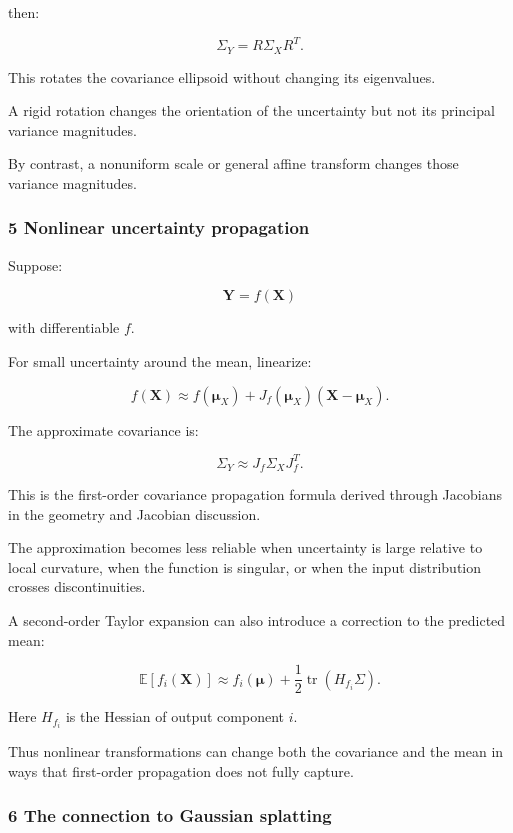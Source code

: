 then:

\[
 \boxed{ \Sigma_Y=R\Sigma_XR^T }.
\]

This rotates the covariance ellipsoid without changing its eigenvalues.

A rigid rotation changes the orientation of the uncertainty but not its principal variance magnitudes.

By contrast, a nonuniform scale or general affine transform changes those variance magnitudes.

\subsubsection{5 Nonlinear uncertainty propagation}\label{02-foundations-ii-ch024-nonlinear-uncertainty-propagation}

\hypertarget{02-foundations-ii-ch024-nonlinear-uncertainty-propagation}{}

Suppose:

\[
 \mathbf Y=f(\mathbf X)
\]

with differentiable \(f\).

For small uncertainty around the mean, linearize:

\[
 f(\mathbf X) \approx f(\boldsymbol\mu_X) + J_f(\boldsymbol\mu_X) (\mathbf X-\boldsymbol\mu_X).
\]

The approximate covariance is:

\[
 \boxed{ \Sigma_Y \approx J_f\Sigma_XJ_f^T }.
\]

This is the first-order covariance propagation formula derived through Jacobians in the geometry and Jacobian discussion.

The approximation becomes less reliable when uncertainty is large relative to local curvature, when the function is singular, or when the input distribution crosses discontinuities.

A second-order Taylor expansion can also introduce a correction to the predicted mean:

\[
 \mathbb E[f_i(\mathbf X)] \approx f_i(\boldsymbol\mu) + \frac12\operatorname{tr}(H_{f_i}\Sigma).
\]

Here \(H_{f_i}\) is the Hessian of output component \(i\).

Thus nonlinear transformations can change both the covariance and the mean in ways that first-order propagation does not fully capture.

\subsubsection{6 The connection to Gaussian splatting}\label{02-foundations-ii-ch024-the-connection-to-gaussian-splatting}


